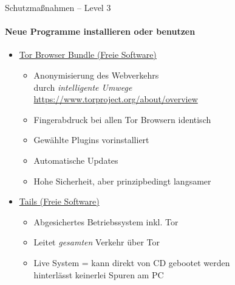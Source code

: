 \begin{frame}{Schutzmaßnahmen -- Level 3}
\framesubtitle{Neue Programme installieren oder benutzen}
  \begin{itemize}
    \item \href{https://www.torproject.org}{Tor Browser Bundle (Freie Software)}
    \begin{itemize}
      \item Anonymisierung des Webverkehrs\\durch \emph{\glqq intelligente Umwege\grqq}\\
        \scriptsize \url{https://www.torproject.org/about/overview} \normalsize
      \item Fingerabdruck bei allen Tor Browsern identisch
      \item Gewählte Plugins vorinstalliert
      \item Automatische Updates
      \item Hohe Sicherheit, aber prinzipbedingt langsamer
    \end{itemize}
    \pause
    \item \href{https://tails.boum.org}{Tails (Freie Software)}
    \begin{itemize}
      \item Abgesichertes Betriebssystem inkl. Tor
      \item Leitet \emph{gesamten} Verkehr über Tor
      \item Live System = kann direkt von CD gebootet werden\\ hinterlässt keinerlei Spuren am PC
    \end{itemize}
  \end{itemize}
\end{frame}

\endinput
